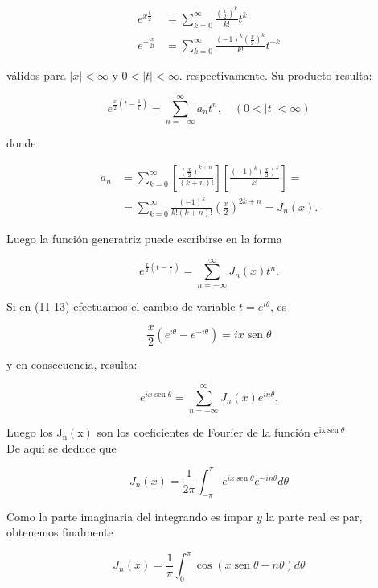 \documentclass[10pt]{article}
\theoremstyle{plain}
\theoremstyle{definition}
\theoremstyle{remark}
\begin{document}
$$
\begin{aligned}
e^{x \frac{t}{2}} & =\sum_{k=0}^{\infty} \frac{\left(\frac{x}{2}\right)^{k}}{k!} t^{k} \\
e^{-\frac{x}{2 t}} & =\sum_{k=0}^{\infty} \frac{(-1)^{k}\left(\frac{x}{2}\right)^{k}}{k!} t^{-k}
\end{aligned}
$$

válidos para $|x|<\infty$ y $0<|t|<\infty$. respectivamente. Su producto resulta:

$$
e^{\frac{x}{2}\left(t-\frac{1}{t}\right)}=\sum_{n=-\infty}^{\infty} a_{n} t^{n}, \quad(0<|t|<\infty)
$$

donde

$$
\begin{aligned}
a_{n} & =\sum_{k=0}^{\infty}\left[\frac{\left(\frac{x}{2}\right)^{k+n}}{(k+n)!}\right]\left[\frac{(-1)^{k}\left(\frac{x}{2}\right)^{k}}{k!}\right]= \\
& =\sum_{k=0}^{\infty} \frac{(-1)^{k}}{k!(k+n)!}\left(\frac{x}{2}\right)^{2 k+n}=J_{n}(x) .
\end{aligned}
$$

Luego la función generatriz puede escribirse en la forma


\begin{equation*}
e^{\frac{x}{2}\left(t-\frac{1}{t}\right)}=\sum_{n=-\infty}^{\infty} J_{n}(x) t^{n} . \tag{11-13}
\end{equation*}


Si en (11-13) efectuamos el cambio de variable $t=e^{i \theta}$, es

$$
\frac{x}{2}\left(e^{i \theta}-e^{-i \theta}\right)=i x \operatorname{sen} \theta
$$

y en consecuencia, resulta:


\begin{equation*}
e^{i x \operatorname{sen} \theta}=\sum_{n=-\infty}^{\infty} J_{n}(x) e^{i n \theta} . \tag{11-14}
\end{equation*}


Luego los $\mathrm{J}_{\mathrm{n}}(\mathrm{x})$ son los coeficientes de Fourier de la función $\mathrm{e}^{\mathrm{ix} \operatorname{sen} \theta}$\\
De aquí se deduce que

$$
J_{n}(x)=\frac{1}{2 \pi} \int_{-\pi}^{\pi} e^{i x \operatorname{sen} \theta} e^{-i n \theta} d \theta
$$

Como la parte imaginaria del integrando es impar $y$ la parte real es par, obtenemos finalmente

$$
J_{n}(x)=\frac{1}{\pi} \int_{0}^{\pi} \cos (x \operatorname{sen} \theta-n \theta) d \theta
$$
\end{document}
